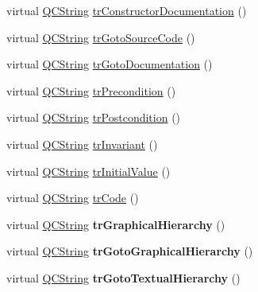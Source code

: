 \begin{DoxyCompactItemize}
virtual \mbox{\hyperlink{class_q_c_string}{Q\+C\+String}} \mbox{\hyperlink{class_translator_portuguese_abb2958599bd47aba650c23dbbbd4e564}{tr\+Constructor\+Documentation}} ()
\item 
virtual \mbox{\hyperlink{class_q_c_string}{Q\+C\+String}} \mbox{\hyperlink{class_translator_portuguese_aee5a037f1d16cfb8040339866c4b5150}{tr\+Goto\+Source\+Code}} ()
\item 
virtual \mbox{\hyperlink{class_q_c_string}{Q\+C\+String}} \mbox{\hyperlink{class_translator_portuguese_a4a080b1b7f549db556044b03abaf6015}{tr\+Goto\+Documentation}} ()
\item 
virtual \mbox{\hyperlink{class_q_c_string}{Q\+C\+String}} \mbox{\hyperlink{class_translator_portuguese_ae309c4296630e24e78bb495e86e5f0ea}{tr\+Precondition}} ()
\item 
virtual \mbox{\hyperlink{class_q_c_string}{Q\+C\+String}} \mbox{\hyperlink{class_translator_portuguese_aadf8e6533da576d7a33745f35a2a68f2}{tr\+Postcondition}} ()
\item 
virtual \mbox{\hyperlink{class_q_c_string}{Q\+C\+String}} \mbox{\hyperlink{class_translator_portuguese_a97df3abf4bebd252fb4369418d01ea31}{tr\+Invariant}} ()
\item 
virtual \mbox{\hyperlink{class_q_c_string}{Q\+C\+String}} \mbox{\hyperlink{class_translator_portuguese_a500c0b21a92bf7c6c3e7fc6a5a55fc7e}{tr\+Initial\+Value}} ()
\item 
virtual \mbox{\hyperlink{class_q_c_string}{Q\+C\+String}} \mbox{\hyperlink{class_translator_portuguese_a127bc0fed927b35fe141bee2793f2c78}{tr\+Code}} ()
\item 
\mbox{\label{class_translator_portuguese_a3b649dcd8c120e65b7f9c9105b4580dd}} 
virtual \mbox{\hyperlink{class_q_c_string}{Q\+C\+String}} {\bfseries tr\+Graphical\+Hierarchy} ()
\item 
\mbox{\label{class_translator_portuguese_a99af93ba73c18c9f2a3c6bf4746f22ef}} 
virtual \mbox{\hyperlink{class_q_c_string}{Q\+C\+String}} {\bfseries tr\+Goto\+Graphical\+Hierarchy} ()
\item 
\mbox{\label{class_translator_portuguese_a9abd8635d3ef33e2650c1b45d6e015a1}} 
virtual \mbox{\hyperlink{class_q_c_string}{Q\+C\+String}} {\bfseries tr\+Goto\+Textual\+Hierarchy} ()
\item 
\mbox{\label{class_translator_portuguese_a7fa71d0ebc939adcd2246c59ac1bf9d1}} 

\end{DoxyCompactItemize}
